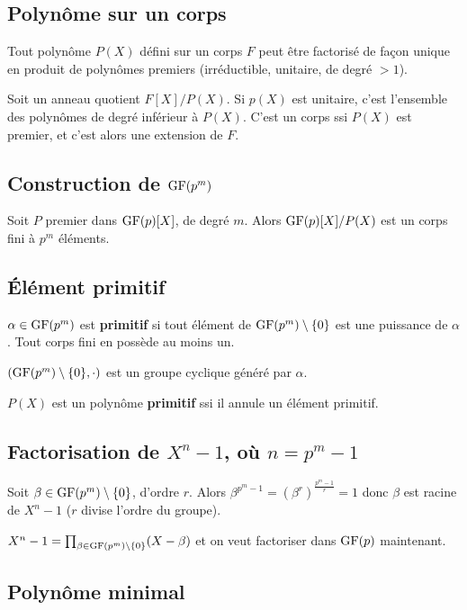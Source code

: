 \subsection{Polynôme sur un corps}

	Tout polynôme $P(X)$ défini sur un corps $F$ peut être factorisé de façon unique en produit de polynômes premiers (irréductible, unitaire, de degré $> 1$).

	Soit un anneau quotient $F[X]/P(X)$.
	Si $p(X)$ est unitaire, c'est l'ensemble des polynômes de degré inférieur à $P(X)$.
	C'est un corps ssi $P(X)$ est premier, et c'est alors une extension de $F$.


\subsection{Construction de $\mathrm{GF}(p^m)$}

	Soit $P$ premier dans $\mathrm{GF}(p)[X]$, de degré $m$.
	Alors $\mathrm{GF}(p)[X]/P(X)$ est un corps fini à $p^m$ éléments.


\subsection{Élément primitif}

	$\alpha \in \mathrm{GF}(p^m)$ est \textbf{primitif} si tout élément de $\mathrm{GF}(p^m) \setminus \{ 0 \}$ est une puissance de $\alpha$.
	Tout corps fini en possède au moins un.

	$(\mathrm{GF}(p^m) \setminus \{ 0 \}, \cdot)$ est un groupe cyclique généré par $\alpha$.

	\begin{defn}
		$P(X)$ est un polynôme \textbf{primitif} ssi il annule un élément primitif.
	\end{defn}


\subsection{Factorisation de $X^n - 1$, où $n = p^m - 1$}

	Soit $\beta \in \mathrm{GF}(p^m) \setminus \{ 0 \}$, d'ordre $r$.
	Alors $\beta^{p^m - 1} = (\beta^r)^{\frac{p^m - 1}{r}} = 1$ donc $\beta$ est racine de $X^n - 1$ ($r$ divise l'ordre du groupe).

	$X^n - 1 = \prod_{\beta \in \mathrm{GF}(p^m) \setminus \{ 0 \} } (X - \beta)$ et on veut factoriser dans $\mathrm{GF}(p)$ maintenant.


\subsection{Polynôme minimal}

